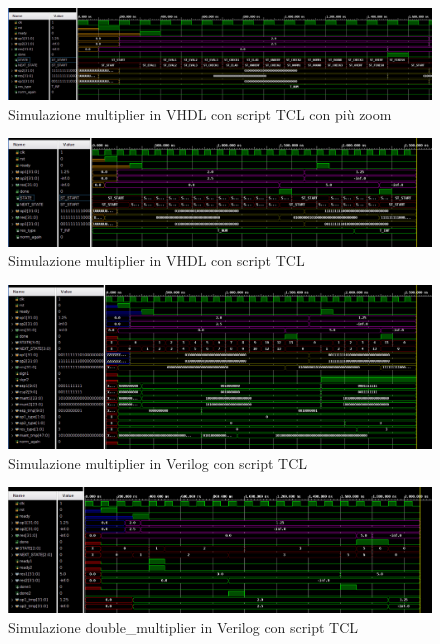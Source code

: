 \documentclass[]{IEEEtran}
\begin{document}
\begin{figure}[bt]
    \centering
    \includegraphics[width=\textwidth]{figures/sim_mult_vhdl_zoom}
    \caption{Simulazione multiplier in VHDL con script TCL con più zoom}
    \label{fig:SIM_MULT_VHDL_ZOOM}
\end{figure}

\begin{figure}[bt]
    \centering
    \includegraphics[width=\textwidth]{figures/sim_mult_vhdl}
    \caption{Simulazione multiplier in VHDL con script TCL}
    \label{fig:SIM_MULT_VHDL}
\end{figure}

\begin{figure}[bt]
    \centering
    \includegraphics[width=\textwidth]{figures/sim_mult_verilog}
    \caption{Simulazione multiplier in Verilog con script TCL}
    \label{fig:SIM_MULT_VERILOG}
\end{figure}

\begin{figure}[bt]
    \centering
    \includegraphics[width=\textwidth]{figures/sim_dm}
    \caption{Simulazione double\_multiplier in Verilog con script TCL}
    \label{fig:SIM_DM}
\end{figure}
\end{document}
